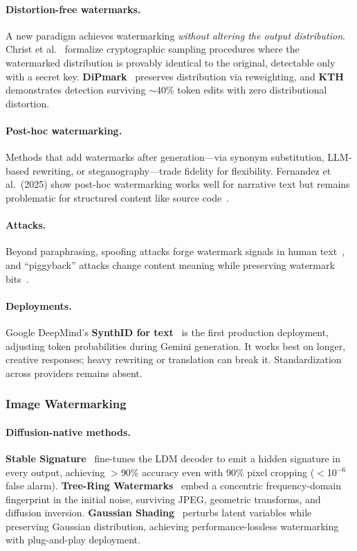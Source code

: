 \paragraph{Distortion-free watermarks.}
A new paradigm achieves watermarking \emph{without altering the output distribution}. Christ et al.~\cite{christ2024undetectable} formalize cryptographic sampling procedures where the watermarked distribution is provably identical to the original, detectable only with a secret key. \textbf{DiPmark}~\cite{wu2023dipmark} preserves distribution via reweighting, and \textbf{KTH}~\cite{kuditipudi2023kth} demonstrates detection surviving $\sim$40\% token edits with zero distributional distortion.

\paragraph{Post-hoc watermarking.}
Methods that add watermarks after generation---via synonym substitution, LLM-based rewriting, or steganography---trade fidelity for flexibility. Fernandez et al.\ (2025) show post-hoc watermarking works well for narrative text but remains problematic for structured content like source code~\cite{fernandez2025posthoc}.

\paragraph{Attacks.}
Beyond paraphrasing, spoofing attacks forge watermark signals in human text~\cite{sadasivan2023spoofing}, and ``piggyback'' attacks change content meaning while preserving watermark bits~\cite{pang2024piggyback}.

\paragraph{Deployments.}
Google DeepMind's \textbf{SynthID for text}~\cite{synthidtext2024} is the first production deployment, adjusting token probabilities during Gemini generation. It works best on longer, creative responses; heavy rewriting or translation can break it. Standardization across providers remains absent.


\subsubsection{Image Watermarking}
\label{sec:wm-image}

\paragraph{Diffusion-native methods.}
\textbf{Stable Signature}~\cite{fernandez2023stablesig} fine-tunes the LDM decoder to emit a hidden signature in every output, achieving $>$90\% accuracy even with 90\% pixel cropping ($<$10$^{-6}$ false alarm). \textbf{Tree-Ring Watermarks}~\cite{wen2023treering} embed a concentric frequency-domain fingerprint in the initial noise, surviving JPEG, geometric transforms, and diffusion inversion. \textbf{Gaussian Shading}~\cite{yang2024gaussianshading} perturbs latent variables while preserving Gaussian distribution, achieving performance-lossless watermarking with plug-and-play deployment.

